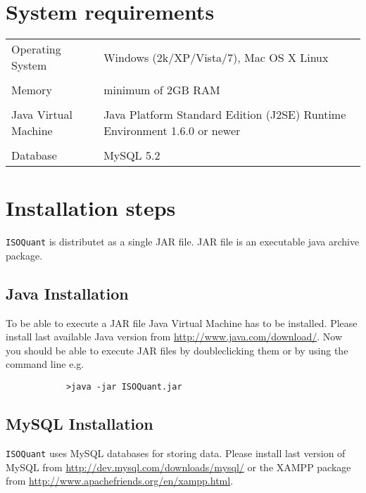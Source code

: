 \documentclass[a4paper,12pt]{scrartcl}
\newcommand{\iq}{\texttt{ISOQuant} }
\begin{document}
\section{System requirements}
	\begin{tabular}{p{} p{}}
      Operating System & Windows (2k/XP/Vista/7), \newline Mac OS X \newline Linux\\\\
      
	  Memory & minimum of 2GB RAM \\\\
      
      Java Virtual Machine & Java\texttrademark 2 Platform Standard Edition (J2SE)\newline
      Runtime Environment 1.6.0 or newer\\\\
      
      
      Database & MySQL 5.2 \\
    \end{tabular}

\newpage
\section{Installation steps}
	\iq is distributet as a single JAR file. JAR file is an executable java archive package.

	\subsection{Java Installation}
		To be able to execute a JAR file Java Virtual Machine has to be installed.
		Please install last available Java version from \url{http://www.java.com/download/}.
		Now you should be able to execute JAR files by doubleclicking them or
		by using the command line e.g. 
		\begin{lstlisting}
			>java -jar ISOQuant.jar
		\end{lstlisting}
		
	\subsection{MySQL Installation}
		\iq uses MySQL databases for storing data. 
		Please install last version of MySQL from \url{http://dev.mysql.com/downloads/mysql/} or 
		the XAMPP package from \url{http://www.apachefriends.org/en/xampp.html}.
		
\end{document}
